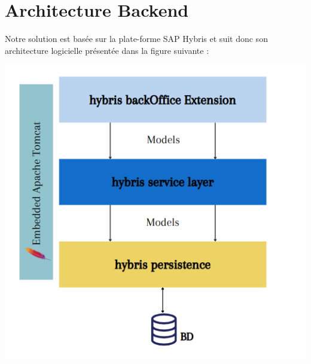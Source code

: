 \section{Architecture Backend}
Notre solution est basée sur la plate-forme SAP Hybris et suit donc son architecture
logicielle présentée dans la figure suivante :

\begin{center}
    \centering
    \includegraphics[width=19cm]{Figures/architecturebacend.png}
    \label{fig:processus}
\end{center}

